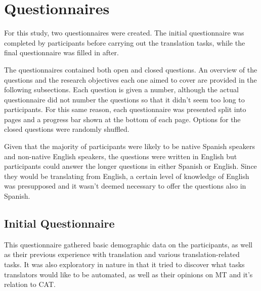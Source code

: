 
\chapter{Questionnaires} %
\label{ch:questionnaires} %



\noindent For this study, two questionnaires were created. The initial questionnaire was completed by participants before carrying out the translation tasks, while the final questionnaire was filled in after.

The questionnaires contained both open and closed questions. An overview of the questions and the research objectives each one aimed to cover are provided in the following subsections. Each question is given a number, although the actual questionnaire did not number the questions so that it didn't seem too long to participants. For this same reason, each questionnaire was presented split into pages and a progress bar shown at the bottom of each page. Options for the closed questions were randomly shuffled. 

Given that the majority of participants were likely to be native Spanish speakers and non-native English speakers, the questions were written in English but participants could answer the longer questions in either Spanish or English. Since they would be translating from English, a certain level of knowledge of English was presupposed and it wasn't deemed necessary to offer the questions also in Spanish.



\section{Initial Questionnaire}

\noindent This questionnaire gathered basic demographic data on the participants, as well as their previous experience with translation and various translation-related tasks. It was also exploratory in nature in that it tried to discover what tasks translators would like to be automated, as well as their opinions on \ac{MT} and it's relation to \ac{CAT}.

